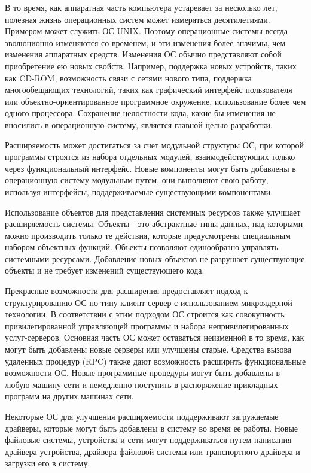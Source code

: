 В то время, как аппаратная часть компьютера устаревает за несколько лет, полезная жизнь операционных систем может измеряться десятилетиями. Примером может служить ОС UNIX. Поэтому операционные системы всегда эволюционно изменяются со временем, и эти изменения более значимы, чем изменения аппаратных средств. Изменения ОС обычно представляют собой приобретение ею новых свойств. Например, поддержка новых устройств, таких как CD-ROM, возможность связи с сетями нового типа, поддержка многообещающих технологий, таких как графический интерфейс пользователя или объектно-ориентированное программное окружение, использование более чем одного
процессора. Сохранение целостности кода, какие бы изменения не вносились в операционную систему, является главной целью разработки.

Расширяемость может достигаться за счет модульной структуры ОС, при которой программы строятся из набора отдельных модулей, взаимодействующих только через функциональный интерфейс. Новые компоненты могут быть добавлены в операционную систему модульным путем, они выполняют свою работу, используя интерфейсы, поддерживаемые существующими компонентами.

Использование объектов для представления системных ресурсов также улучшает расширяемость системы. Объекты - это абстрактные типы данных, над которыми можно производить только те действия, которые предусмотрены специальным набором объектных функций. Объекты позволяют единообразно управлять системными ресурсами. Добавление новых объектов не разрушает существующие объекты и не требует изменений существующего кода.

Прекрасные возможности для расширения предоставляет подход к структурированию ОС по типу клиент-сервер с использованием микроядерной технологии. В соответствии с этим подходом ОС строится как совокупность привилегированной управляющей программы и набора непривилегированных услуг-серверов. Основная часть ОС может оставаться неизменной в то время, как могут быть добавлены новые серверы или улучшены старые.
Средства вызова удаленных процедур (RPC) также дают возможность расширить функциональные возможности ОС. Новые программные процедуры могут быть добавлены в любую машину сети и немедленно поступить в распоряжение прикладных программ на других машинах сети.

Некоторые ОС для улучшения расширяемости поддерживают загружаемые драйверы, которые могут быть добавлены в систему во время ее работы. Новые файловые системы, устройства и сети могут поддерживаться путем написания драйвера устройства, драйвера файловой системы или транспортного драйвера и загрузки его в систему.
\newline

